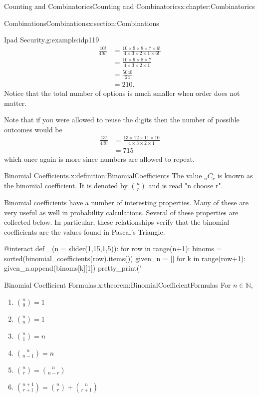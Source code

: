 \documentclass[oneside,10pt,]{book}
\numberwithin{equation}{section}
\begin{document}
\begin{chapterptx}{Counting and Combinatorics}{}{Counting and Combinatorics}{}{}{x:chapter:Combinatorics}
\begin{sectionptx}{Combinations}{}{Combinations}{}{}{x:section:Combinations}
\begin{example}{Ipad Security.}{g:example:idp119}
\begin{align*}
\frac{10!}{4!6!} & = \frac{10 \times 9 \times 8 \times 7 \times 6!}{4 \times 3 \times 2 \times 1 \times 6!}\\
& = \frac{10 \times 9 \times 8 \times 7}{4 \times 3 \times 2 \times 1}\\
& = \frac{5040}{24}\\
& = 210.
\end{align*}
Notice that the total number of options is much smaller when order does not matter.%
\par
Note that if you were allowed to reuse the digits then the number of possible outcomes would be%
\begin{align*}
\frac{13!}{4!9!} & = \frac{13 \times 12 \times 11 \times 10}{4 \times 3 \times 2 \times 1} \\
& = 715
\end{align*}
which once again is more since numbers are allowed to repeat.%
\end{example}
\begin{definition}{Binomial Coefficients.}{x:definition:BinomialCoefficients}%
The value \(_nC_r\) is known as the binomial coefficient. It is denoted by \({n \choose r}\) and is read "n choose r".%
\end{definition}
Binomial coefficients have a number of interesting properties.  Many of these are very useful as well in probability calculations.  Several of these properties are collected below. In particular, these relationships verify that the binomial coefficients are the values found in Pascal's Triangle.%
\begin{sageinput}
@interact
def _(n = slider(1,15,1,5)):
    for row in range(n+1):
        binoms = sorted(binomial_coefficients(row).items())
        given_n = []
        for k in range(row+1):
            given_n.append(binoms[k][1])
        pretty_print('%
\end{sageinput}
\begin{theorem}{Binomial Coefficient Formulas.}{}{x:theorem:BinomialCoefficientFormulas}%
For \(n \in \mathbb{N}\),%
\begin{enumerate}
\item{}\(\displaystyle \binom{n}{0} = 1\)%
\item{}\(\displaystyle \binom{n}{n} = 1\)%
\item{}\(\displaystyle \binom{n}{1} = n\)%
\item{}\(\displaystyle \binom{n}{n-1} = n\)%
\item{}\(\displaystyle \binom{n}{r} = \binom{n}{n-r}\)%
\item{}\(\displaystyle \binom{n+1}{r+1} = \binom{n}{r} + \binom{n}{r+1}\)%

\end{enumerate}
\end{theorem}
\end{sectionptx}
\end{chapterptx}
\end{document}
